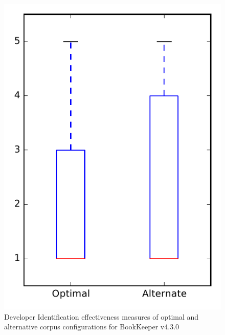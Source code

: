 
\begin{figure}
\centering
\includegraphics[height=0.4\textheight]{figures/combo/dit_rq2_bookkeeper}
\caption{Developer Identification effectiveness measures of optimal and alternative corpus configurations for BookKeeper v4.3.0}
\label{fig:combo:dit:rq2:bookkeeper}
\end{figure}
